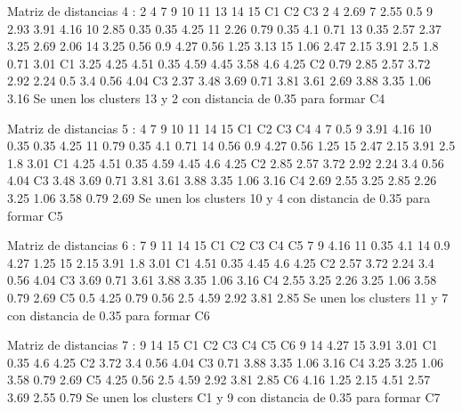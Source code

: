 \documentclass[a4paper, 12pt]{article}
\begin{document}
\begin{itemize}
\begin{Schunk}
\begin{Soutput}
Matriz de distancias 4 :
   2    4    7    9    10   11   13   14   15   C1   C2   C3
2                                                           
4  2.69                                                     
7  2.55 0.5                                                 
9  2.93 3.91 4.16                                           
10 2.85 0.35 0.35 4.25                                      
11 2.26 0.79 0.35 4.1  0.71                                 
13 0.35 2.57 2.37 3.25 2.69 2.06                            
14 3.25 0.56 0.9  4.27 0.56 1.25 3.13                       
15 1.06 2.47 2.15 3.91 2.5  1.8  0.71 3.01                  
C1 3.25 4.25 4.51 0.35 4.59 4.45 3.58 4.6  4.25             
C2 0.79 2.85 2.57 3.72 2.92 2.24 0.5  3.4  0.56 4.04        
C3 2.37 3.48 3.69 0.71 3.81 3.61 2.69 3.88 3.35 1.06 3.16   
Se unen los clusters 13 y 2 con distancia de 0.35 para formar C4 

Matriz de distancias 5 :
   4    7    9    10   11   14   15   C1   C2   C3   C4
4                                                      
7  0.5                                                 
9  3.91 4.16                                           
10 0.35 0.35 4.25                                      
11 0.79 0.35 4.1  0.71                                 
14 0.56 0.9  4.27 0.56 1.25                            
15 2.47 2.15 3.91 2.5  1.8  3.01                       
C1 4.25 4.51 0.35 4.59 4.45 4.6  4.25                  
C2 2.85 2.57 3.72 2.92 2.24 3.4  0.56 4.04             
C3 3.48 3.69 0.71 3.81 3.61 3.88 3.35 1.06 3.16        
C4 2.69 2.55 3.25 2.85 2.26 3.25 1.06 3.58 0.79 2.69   
Se unen los clusters 10 y 4 con distancia de 0.35 para formar C5 

Matriz de distancias 6 :
   7    9    11   14   15   C1   C2   C3   C4   C5
7                                                 
9  4.16                                           
11 0.35 4.1                                       
14 0.9  4.27 1.25                                 
15 2.15 3.91 1.8  3.01                            
C1 4.51 0.35 4.45 4.6  4.25                       
C2 2.57 3.72 2.24 3.4  0.56 4.04                  
C3 3.69 0.71 3.61 3.88 3.35 1.06 3.16             
C4 2.55 3.25 2.26 3.25 1.06 3.58 0.79 2.69        
C5 0.5  4.25 0.79 0.56 2.5  4.59 2.92 3.81 2.85   
Se unen los clusters 11 y 7 con distancia de 0.35 para formar C6 

Matriz de distancias 7 :
   9    14   15   C1   C2   C3   C4   C5   C6
9                                            
14 4.27                                      
15 3.91 3.01                                 
C1 0.35 4.6  4.25                            
C2 3.72 3.4  0.56 4.04                       
C3 0.71 3.88 3.35 1.06 3.16                  
C4 3.25 3.25 1.06 3.58 0.79 2.69             
C5 4.25 0.56 2.5  4.59 2.92 3.81 2.85        
C6 4.16 1.25 2.15 4.51 2.57 3.69 2.55 0.79   
Se unen los clusters C1 y 9 con distancia de 0.35 para formar C7 


\end{Soutput}
\end{Schunk}
\end{itemize}
\end{document}
